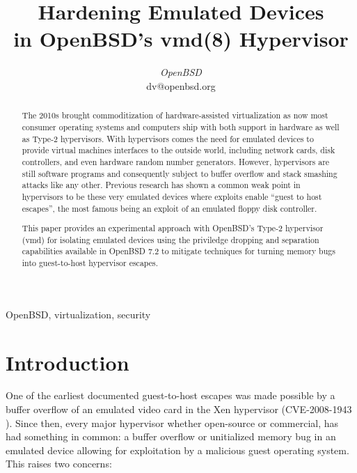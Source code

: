 \documentclass[conference]{IEEEtran}
\begin{document}
\title{Hardening Emulated Devices \\ in OpenBSD's vmd(8) Hypervisor}

\author{
\textit{OpenBSD}\\
dv@openbsd.org}

\maketitle

\begin{abstract}
The 2010s brought commoditization of hardware-assisted virtualization
as now most consumer operating systems and computers ship with both
support in hardware as well as Type-2 hypervisors. With hypervisors
comes the need for emulated devices to provide virtual machines
interfaces to the outside world, including network cards, disk
controllers, and even hardware random number generators. However,
hypervisors are still software programs and consequently subject to
buffer overflow and stack smashing attacks like any other. Previous
research has shown a common weak point in hypervisors to be these very
emulated devices where exploits enable ``guest to host escapes'', the
most famous being an exploit of an emulated floppy disk controller.

This paper provides an experimental approach with OpenBSD's Type-2
hypervisor (vmd) for isolating emulated devices using the priviledge
dropping and separation capabilities available in OpenBSD 7.2 to
mitigate techniques for turning memory bugs into guest-to-host
hypervisor escapes.
\end{abstract}

\vspace{2mm}
\begin{IEEEkeywords}
OpenBSD, virtualization, security
\end{IEEEkeywords}

\vspace{5mm}
\section{Introduction}
One of the earliest documented guest-to-host escapes was made possible
by a buffer overflow of an emulated video card in the Xen hypervisor
(CVE-2008-1943 \cite{b1}). Since then, every major hypervisor whether
open-source or commercial, has had something in common: a buffer
overflow or unitialized memory bug in an emulated device allowing for
exploitation by a malicious guest operating system. This raises two
concerns:
\end{document}
